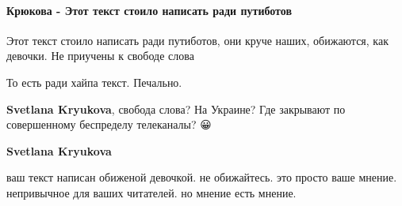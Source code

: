 
 
 
 
 
\paragraph{Крюкова - Этот текст стоило написать ради путиботов}

\begin{itemize}
 
Этот текст стоило написать ради путиботов, они круче наших, обижаются, как девочки. Не приучены к свободе слова

\begin{itemize}
 
То есть ради хайпа текст. Печально.

 
\textbf{Svetlana Kryukova}, свобода слова? На Украине? Где закрывают по совершенному беспределу телеканалы? 😀

 
\textbf{Svetlana Kryukova} 

ваш текст написан обиженой девочкой. не обижайтесь. это просто ваше мнение. непривычное для ваших читателей. но мнение есть мнение.


 

\end{itemize}
\end{itemize}
